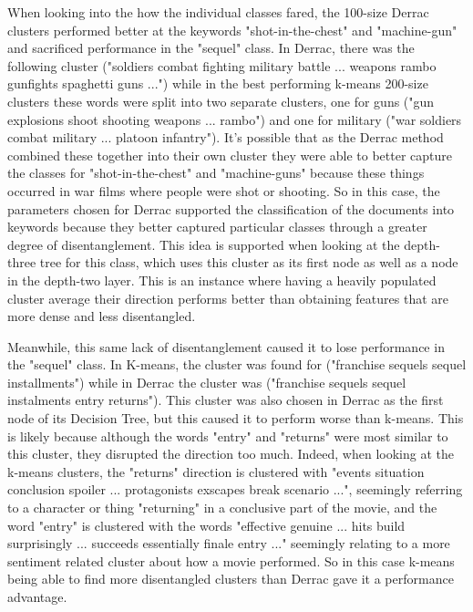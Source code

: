 When looking into the how the individual classes fared, the 100-size Derrac clusters performed better at the keywords "shot-in-the-chest" and "machine-gun" and sacrificed performance in the "sequel" class. In Derrac, there was the following cluster ("soldiers combat fighting military battle ... weapons rambo gunfights spaghetti guns ...") while in the best performing k-means 200-size clusters these words were split into two separate clusters, one for guns ("gun explosions shoot shooting weapons ... rambo") and one for military ("war soldiers combat military ... platoon infantry"). It's possible that as the Derrac method combined these together into their own cluster they were able to better capture the classes for "shot-in-the-chest" and "machine-guns" because these things occurred in war films where people were shot or shooting. So in this case, the parameters chosen for Derrac supported the classification of the documents into keywords because they better captured particular classes through a greater degree of disentanglement. This idea is supported when looking at the depth-three tree for this class, which uses this cluster as its first node as well as a node in the depth-two layer. This is an instance where having a heavily populated cluster average their direction performs better than obtaining features that are more dense and less disentangled. 

Meanwhile, this same lack of disentanglement caused it to lose performance in the "sequel" class. In K-means, the cluster was found for ("franchise sequels sequel installments") while in Derrac the cluster was ("franchise sequels sequel instalments entry returns"). This cluster was also chosen in Derrac as the first node of its Decision Tree, but this caused it to perform worse than k-means. This is likely because although the words "entry" and "returns" were most similar to this cluster, they disrupted the direction too much. Indeed, when looking at the k-means clusters, the "returns" direction is clustered with "events situation conclusion spoiler ... protagonists exscapes break scenario ...", seemingly referring to a character or thing "returning" in a conclusive part of the movie, and the word "entry" is clustered with the words "effective genuine ... hits build surprisingly ... succeeds essentially finale entry ..." seemingly relating to a more sentiment related cluster about how a movie performed. So in this case k-means being able to find more disentangled clusters than Derrac gave it a performance advantage. 

